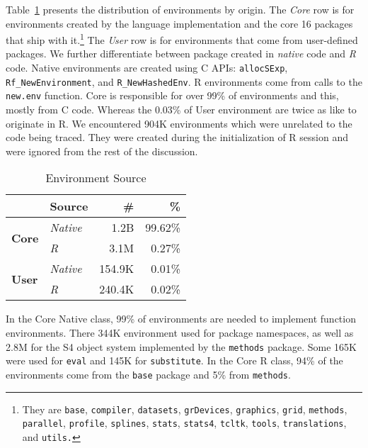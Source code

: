 \documentclass[10pt,review,sigplan,authorversion=true]{acmart}
\newcommand{\code}[1]{\lstinline |#1|\xspace}
\renewcommand{\c}[1]{\lstinline |#1|\xspace}
\newcommand{\newEnv}{\code{new.env}}
\begin{document}
Table~\ref{table:env_source} presents the distribution of environments by
origin. The \emph{Core} row is for environments created by the language
implementation and the core 16 packages that ship with it.\footnote{They are
\code{base}, \code{compiler}, \code{datasets}, \code{grDevices},
\code{graphics}, \code{grid}, \code{methods}, \code{parallel}, \code{profile},
\code{splines}, \code{stats}, \code{stats4}, \code{tcltk}, \code{tools},
\code{translations}, and \code{utils.}} The \emph{User} row is for environments
that come from user-defined packages. We further differentiate between package
created in \emph{native} code and \emph{R} code. Native environments are created
using C APIs: \code{allocSExp}, \\\code{Rf_NewEnvironment}, and
\code{R_NewHashedEnv}. R environments come from calls to the \newEnv function.
Core is responsible for over 99\% of environments and this, mostly from C code.
Whereas the 0.03\% of User environment are twice as like to originate in R. We
encountered 904K environments which were unrelated to the code being traced.
They were created during the initialization of R session and were ignored from
the rest of the discussion.

\begin{table}[!h]
  \small
  \centering
  \caption{Environment Source}\label{table:env_source}
  \vspace{-3mm}
  \begin{tabular}{llrr}
    \toprule
    &\textbf{Source}&\textbf{\#}&\textbf{\%}\\
    \midrule
    \multirow{2}{*}{\textbf{Core}}  & \multicolumn{1}{l}{\emph{Native}} & \multicolumn{1}{r}{1.2B} & \multicolumn{1}{r}{99.62\%}\\
                                    & \multicolumn{1}{l}{\emph{R}}      & \multicolumn{1}{r}{3.1M} & \multicolumn{1}{r}{0.27\%}\\
    \midrule
    \multirow{2}{*}{\textbf{User}}  & \multicolumn{1}{l}{\emph{Native}} & \multicolumn{1}{r}{154.9K} & \multicolumn{1}{r}{0.01\%}\\
                                    & \multicolumn{1}{l}{\emph{R}}      & \multicolumn{1}{r}{240.4K} & \multicolumn{1}{r}{0.02\%}\\
    \bottomrule
  \end{tabular}
\end{table}

In the Core Native class, 99\% of environments are needed to implement function
environments. There 344K environment used for package namespaces, as well as
2.8M for the S4 object system implemented by the \code{methods} package. Some
165K were used for \c{eval} and 145K for \c{substitute}. In the Core R class,
94\% of the environments come from the \c{base} package and 5\% from
\code{methods}.
\end{document}
